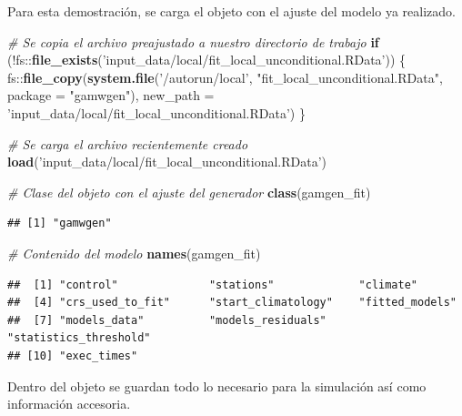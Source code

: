 \documentclass[
  12pt]{article}
\newenvironment{Shaded}{}{}
\newcommand{\CommentTok}[1]{\textcolor[rgb]{0.38,0.63,0.69}{\textit{#1}}}
\newcommand{\ControlFlowTok}[1]{\textcolor[rgb]{0.00,0.44,0.13}{\textbf{#1}}}
\newcommand{\DataTypeTok}[1]{\textcolor[rgb]{0.56,0.13,0.00}{#1}}
\newcommand{\KeywordTok}[1]{\textcolor[rgb]{0.00,0.44,0.13}{\textbf{#1}}}
\newcommand{\NormalTok}[1]{#1}
\newcommand{\OperatorTok}[1]{\textcolor[rgb]{0.40,0.40,0.40}{#1}}
\newcommand{\StringTok}[1]{\textcolor[rgb]{0.25,0.44,0.63}{#1}}
\begin{document}
Para esta demostración, se carga el objeto con el ajuste del modelo ya realizado.

\begin{Shaded}
\begin{Highlighting}[]
\CommentTok{# Se copia el archivo preajustado a nuestro directorio de trabajo}
\ControlFlowTok{if}\NormalTok{ (}\OperatorTok{!}\NormalTok{fs}\OperatorTok{::}\KeywordTok{file_exists}\NormalTok{(}\StringTok{'input_data/local/fit_local_unconditional.RData'}\NormalTok{)) \{}
\NormalTok{  fs}\OperatorTok{::}\KeywordTok{file_copy}\NormalTok{(}\KeywordTok{system.file}\NormalTok{(}\StringTok{'/autorun/local'}\NormalTok{, }\StringTok{"fit_local_unconditional.RData"}\NormalTok{, }
                            \DataTypeTok{package =} \StringTok{"gamwgen"}\NormalTok{),}
                \DataTypeTok{new_path =} \StringTok{'input_data/local/fit_local_unconditional.RData'}\NormalTok{)}
\NormalTok{\}}

\CommentTok{# Se carga el archivo recientemente creado}
\KeywordTok{load}\NormalTok{(}\StringTok{'input_data/local/fit_local_unconditional.RData'}\NormalTok{)}

\CommentTok{# Clase del objeto con el ajuste del generador}
\KeywordTok{class}\NormalTok{(gamgen_fit)}
\end{Highlighting}
\end{Shaded}

\begin{verbatim}
## [1] "gamwgen"
\end{verbatim}

\begin{Shaded}
\begin{Highlighting}[]
\CommentTok{# Contenido del modelo }
\KeywordTok{names}\NormalTok{(gamgen_fit)}
\end{Highlighting}
\end{Shaded}

\begin{verbatim}
##  [1] "control"              "stations"             "climate"             
##  [4] "crs_used_to_fit"      "start_climatology"    "fitted_models"       
##  [7] "models_data"          "models_residuals"     "statistics_threshold"
## [10] "exec_times"
\end{verbatim}

Dentro del objeto se guardan todo lo necesario para la simulación así como información accesoria.
\end{document}
